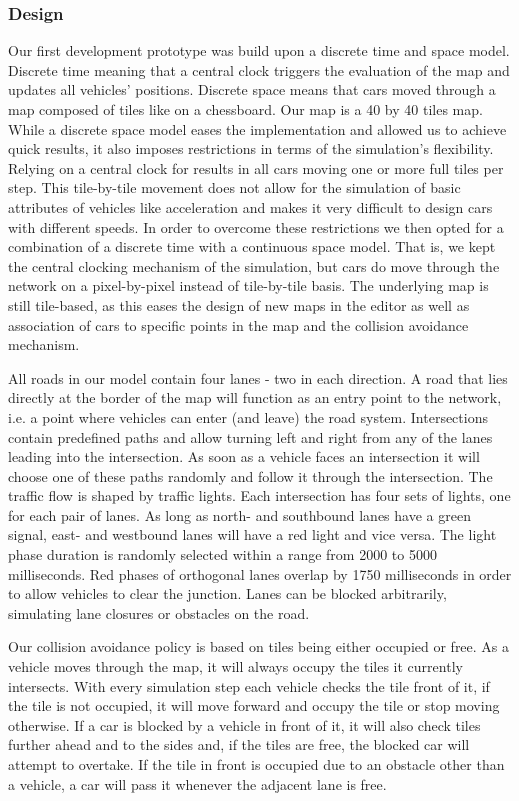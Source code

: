\subsubsection{Design}
Our first development prototype was build upon a discrete time and space model. Discrete time meaning that a central clock triggers the evaluation of the map and updates all vehicles' positions. Discrete space means that cars moved through a map composed of tiles like on a chessboard. Our map is a  40 by 40 tiles map. While a discrete space model eases the implementation and allowed us to achieve quick results, it also imposes restrictions in terms of the simulation's flexibility. Relying on a central clock for results in all cars moving one or more full tiles per step. This tile-by-tile movement does not allow for the simulation of basic attributes of vehicles like acceleration and makes it very difficult to design cars with different speeds. In order to overcome these restrictions we then opted for a combination of a discrete time  with a continuous space model. That is, we kept the central clocking mechanism of the simulation, but cars do move through the network on a pixel-by-pixel instead of tile-by-tile basis. The underlying map is still tile-based, as this eases the design of new maps in the editor as well as association of cars to specific points in the map and the collision avoidance mechanism.

All roads in our model contain four lanes - two in each direction. A road that lies directly at the border of the map will function as an entry point to the network, i.e. a point where vehicles can enter (and leave) the road system. Intersections contain predefined paths and allow turning left and right from any of the lanes leading into the intersection. As soon as a vehicle faces an intersection it will choose one of these paths randomly and follow it through the intersection. The traffic flow is shaped by traffic lights. Each intersection has four sets of lights, one for each pair of lanes. As long as north- and southbound lanes have a green signal, east- and westbound lanes will have a red light and vice versa. The light phase duration is randomly selected within a range from 2000 to 5000 milliseconds. Red phases of orthogonal lanes overlap by 1750 milliseconds in order to allow vehicles to clear the junction. Lanes can be blocked arbitrarily, simulating lane closures or obstacles on the road.

Our collision avoidance policy is based on tiles being either occupied or free. As a vehicle moves through the map, it will always occupy the tiles it currently intersects. With every simulation step each vehicle checks the tile front of it, if the tile is not occupied, it will move forward and occupy the tile or stop moving otherwise. If a car is blocked by a vehicle in front of it, it will also check tiles further ahead and to the sides and, if the tiles are free, the blocked car will attempt to overtake. If the tile in front is occupied due to an obstacle other than a vehicle, a car will pass it whenever the adjacent lane is free.

